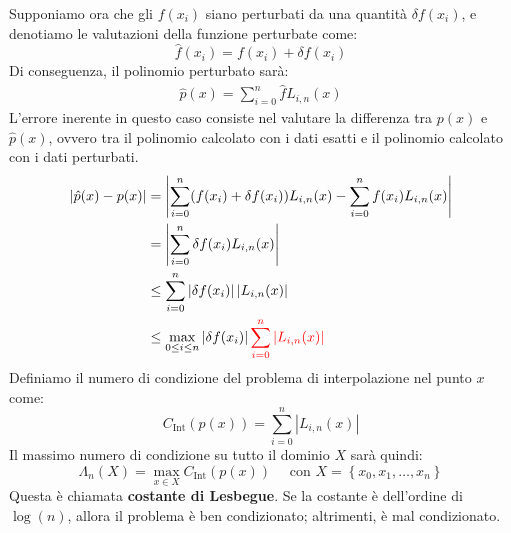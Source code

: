 \documentclass{article}
\begin{document}
Supponiamo ora che gli $f(x_i)$ siano perturbati da una quantità $\delta
f(x_i)$, e denotiamo le valutazioni della funzione perturbate come:
$$\hat{f}(x_i)=f(x_i)+\delta f(x_i)$$ 
Di conseguenza, il polinomio perturbato sarà:
\begin{equation*}
   \begin{aligned}
       \hat{p}(x)=\displaystyle\sum_{i=0}^{n}\hat{f}L_{i,n}(x)
   \end{aligned} 
\end{equation*}
L'errore inerente in questo caso consiste nel valutare la differenza tra
$p(x)$ e $\hat{p}(x)$, ovvero tra il polinomio calcolato con i dati esatti e
il polinomio calcolato con i dati perturbati.
\begin{equation*}
   \begin{aligned}
       \left\lvert \hat{p}(x)-p(x)\right\rvert &=\left\lvert
           \displaystyle\sum_{i=0}^{n}(f(x_i)+\delta
       f(x_i))L_{i,n}(x)-\displaystyle\sum_{i=0}^{n}f(x_i)L_{i,n}(x)\right\rvert\\ 
                         &= \left\lvert \displaystyle\sum_{i=0}^{n}\delta
                         f(x_i)L_{i,n}(x)\right\rvert\\
                         &\leq \displaystyle\sum_{i=0}^{n} \left\lvert \delta
                         f(x_i)\right\rvert \left\lvert
                         L_{i,n}(x)\right\rvert\\ 
                         &\leq \max_{0\leq i\leq n}\left\lvert \delta
                         f(x_i)\right\rvert
                         {\color{red}\displaystyle\sum_{i=0}^{n}\left\lvert
                         L_{i,n}(x)\right\rvert}
   \end{aligned} 
\end{equation*}
Definiamo il numero di condizione del problema di interpolazione nel punto $x$
come:
$$C_{\text{Int}}(p(x))=\displaystyle\sum_{i=0}^{n}\left\lvert L_{i,n}(x)\right\rvert$$
Il massimo numero di condizione su tutto il dominio $X$ sarà quindi:
$$\Lambda_n(X)=\max_{x\in X} C_{\text{Int}}(p(x))\quad \text{ con }X=\left\{
    x_0,x_1,\ldots,x_n
\right\}$$
Questa è chiamata \textbf{costante di Lesbegue}. Se la costante è dell'ordine
di $\log(n)$, allora il problema è ben condizionato; altrimenti, è mal
condizionato.
\newpage
\end{document}
